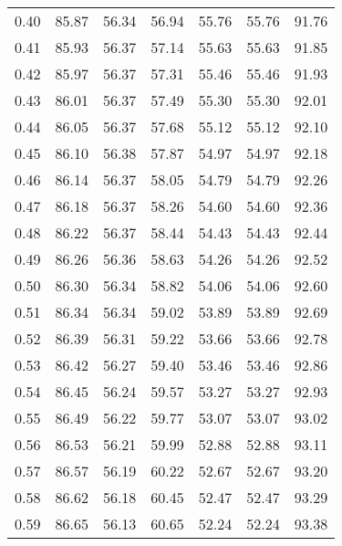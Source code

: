 \begin{tabular}{|c|c|c|c|c|c|c|}
      0.40 &     85.87 &     56.34 &      56.94 &   55.76 &      55.76 &         91.76 \\
      0.41 &     85.93 &     56.37 &      57.14 &   55.63 &      55.63 &         91.85 \\
      0.42 &     85.97 &     56.37 &      57.31 &   55.46 &      55.46 &         91.93 \\
      0.43 &     86.01 &     56.37 &      57.49 &   55.30 &      55.30 &         92.01 \\
      0.44 &     86.05 &     56.37 &      57.68 &   55.12 &      55.12 &         92.10 \\
      0.45 &     86.10 &     56.38 &      57.87 &   54.97 &      54.97 &         92.18 \\
      0.46 &     86.14 &     56.37 &      58.05 &   54.79 &      54.79 &         92.26 \\
      0.47 &     86.18 &     56.37 &      58.26 &   54.60 &      54.60 &         92.36 \\
      0.48 &     86.22 &     56.37 &      58.44 &   54.43 &      54.43 &         92.44 \\
      0.49 &     86.26 &     56.36 &      58.63 &   54.26 &      54.26 &         92.52 \\
      0.50 &     86.30 &     56.34 &      58.82 &   54.06 &      54.06 &         92.60 \\
      0.51 &     86.34 &     56.34 &      59.02 &   53.89 &      53.89 &         92.69 \\
      0.52 &     86.39 &     56.31 &      59.22 &   53.66 &      53.66 &         92.78 \\
      0.53 &     86.42 &     56.27 &      59.40 &   53.46 &      53.46 &         92.86 \\
      0.54 &     86.45 &     56.24 &      59.57 &   53.27 &      53.27 &         92.93 \\
      0.55 &     86.49 &     56.22 &      59.77 &   53.07 &      53.07 &         93.02 \\
      0.56 &     86.53 &     56.21 &      59.99 &   52.88 &      52.88 &         93.11 \\
      0.57 &     86.57 &     56.19 &      60.22 &   52.67 &      52.67 &         93.20 \\
      0.58 &     86.62 &     56.18 &      60.45 &   52.47 &      52.47 &         93.29 \\
      0.59 &     86.65 &     56.13 &      60.65 &   52.24 &      52.24 &         93.38 \\

\end{tabular}
